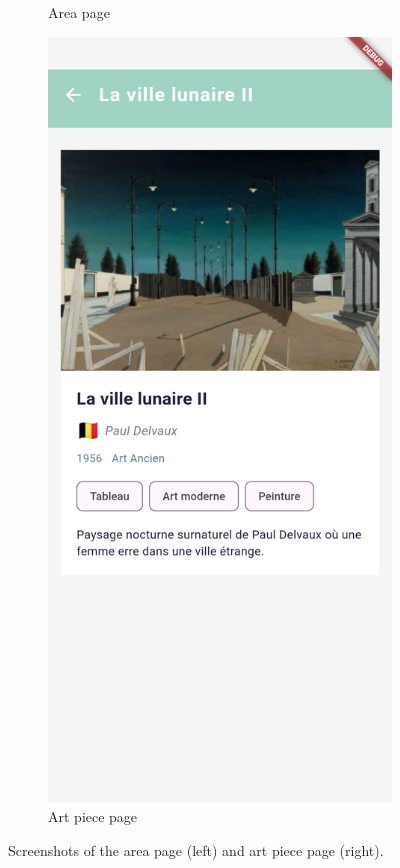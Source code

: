 \begin{figure}[h]
\begin{subfigure}[b]{0.33\linewidth}
        \caption{Area page}
        \label{fig:app-area}
    \end{subfigure}
    \hspace{3em} %
    \begin{subfigure}[b]{0.33\linewidth}
        \includegraphics[width=\linewidth]{assets/application-art-piece.png}
        \caption{Art piece page}
        \label{fig:app-art-piece}
    \end{subfigure}
    \caption{Screenshots of the area page (left) and art piece page (right).}
    \label{fig:app-area-piece}
\end{figure}

